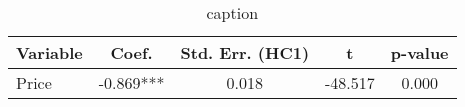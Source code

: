 \begin{table}[H]
\centering
\caption{{{caption}}}
\label{{{label}}}
\begin{tabular}{lcccc}
\toprule
Variable & Coef. & Std. Err. (HC1) & t & p-value \\
\midrule
Price & -0.869*** & 0.018 & -48.517 & 0.000 \\
\bottomrule
\end{tabular}
\end{table}
